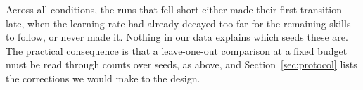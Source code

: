 Across all conditions, the runs that fell short either made their first transition late, when the learning rate had already decayed too far for the remaining skills to follow, or never made it.
Nothing in our data explains which seeds these are.
The practical consequence is that a leave-one-out comparison at a fixed budget must be read through counts over seeds, as above, and Section~\ref{sec:protocol} lists the corrections we would make to the design.
